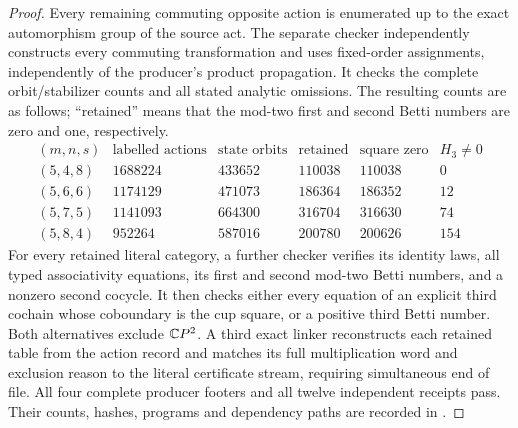 \begin{proof}
Every remaining commuting opposite action is enumerated
up to the exact automorphism group of the source act.
The separate checker independently constructs every commuting
transformation and uses fixed-order assignments, independently of the
producer's product propagation. It checks the complete
orbit/stabilizer counts and all stated analytic omissions.
The resulting counts are as follows; ``retained'' means
that the mod-two first and second Betti numbers are zero
and one, respectively.
\[
\begin{array}{c|r|r|r|r|r}
(m,n,s)&\text{labelled actions}&\text{state orbits}&
\text{retained}&\text{square zero}&H_3\ne0\\\hline
(5,4,8)&1688224&433652&110038&110038&0\\
(5,6,6)&1174129&471073&186364&186352&12\\
(5,7,5)&1141093&664300&316704&316630&74\\
(5,8,4)&952264&587016&200780&200626&154
\end{array}
\]
For every retained literal category, a further checker
verifies its identity laws, all typed associativity equations,
its first and second mod-two Betti numbers, and a nonzero
second cocycle. It then checks either every equation of
an explicit third cochain whose coboundary is the cup
square, or a positive third Betti number. Both alternatives
exclude $\mathbb{C}P^2$.
A third exact linker reconstructs each retained table from
the action record and matches its full multiplication word
and exclusion reason to the literal certificate stream,
requiring simultaneous end of file. All four complete
producer footers and all twelve independent receipts pass.
Their counts, hashes, programs and dependency paths are
recorded in
.
\end{proof}
